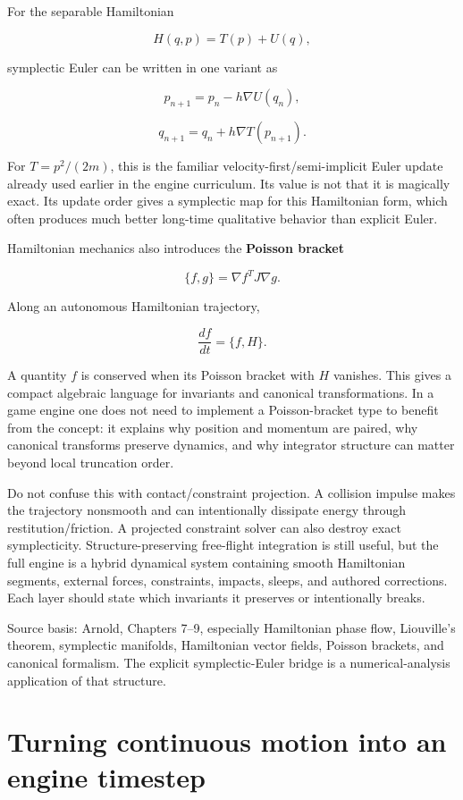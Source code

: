 For the separable Hamiltonian

\[
H(q,p)=T(p)+U(q),
\]

symplectic Euler can be written in one variant as

\[
p_{n+1}
=
p_n-h\nabla U(q_n),
\]

\[
q_{n+1}
=
q_n+h\nabla T(p_{n+1}).
\]

For \(T=p^2/(2m)\), this is the familiar velocity-first/semi-implicit Euler update already used earlier in the engine curriculum. Its value is not that it is magically exact. Its update order gives a symplectic map for this Hamiltonian form, which often produces much better long-time qualitative behavior than explicit Euler.

Hamiltonian mechanics also introduces the \textbf{Poisson bracket}

\[
\{f,g\}
=
\nabla f^T J\nabla g.
\]

Along an autonomous Hamiltonian trajectory,

\[
\frac{df}{dt}
=
\{f,H\}.
\]

A quantity \(f\) is conserved when its Poisson bracket with \(H\) vanishes. This gives a compact algebraic language for invariants and canonical transformations. In a game engine one does not need to implement a Poisson-bracket type to benefit from the concept: it explains why position and momentum are paired, why canonical transforms preserve dynamics, and why integrator structure can matter beyond local truncation order.

Do not confuse this with contact/constraint projection. A collision impulse makes the trajectory nonsmooth and can intentionally dissipate energy through restitution/friction. A projected constraint solver can also destroy exact symplecticity. Structure-preserving free-flight integration is still useful, but the full engine is a hybrid dynamical system containing smooth Hamiltonian segments, external forces, constraints, impacts, sleeps, and authored corrections. Each layer should state which invariants it preserves or intentionally breaks.

Source basis: Arnold, Chapters 7--9, especially Hamiltonian phase flow, Liouville's theorem, symplectic manifolds, Hamiltonian vector fields, Poisson brackets, and canonical formalism. The explicit symplectic-Euler bridge is a numerical-analysis application of that structure.

\section{Turning continuous motion into an engine timestep}\label{02-foundations-ii-ch039-turning-continuous-motion-into-an-engine-timestep}

